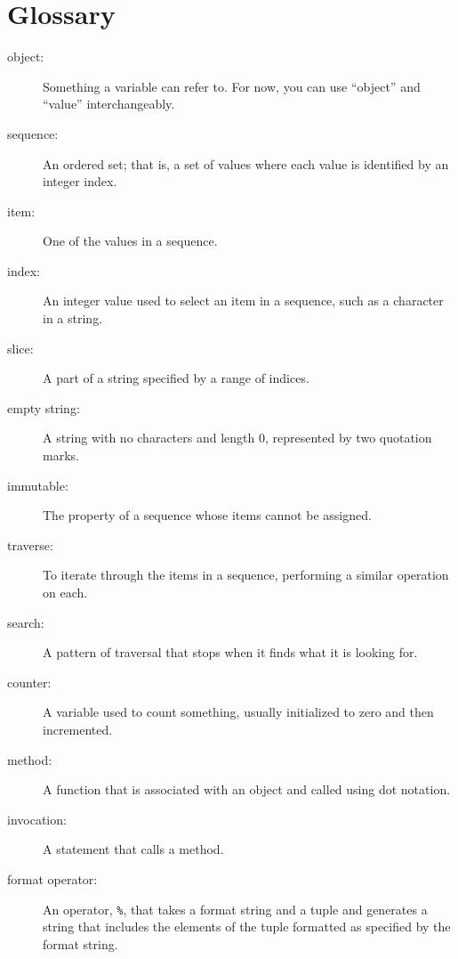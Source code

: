 \documentclass[10pt]{book}
\begin{document}
\section{Glossary}

\begin{description}

\item[object:] Something a variable can refer to.  For now,
you can use ``object'' and ``value'' interchangeably.

\item[sequence:] An ordered set; that is, a set of
values where each value is identified by an integer index.

\item[item:] One of the values in a sequence.

\item[index:] An integer value used to select an item in
a sequence, such as a character in a string.

\item[slice:] A part of a string specified by a range of indices.

\item[empty string:] A string with no characters and length 0, represented
by two quotation marks.

\item[immutable:] The property of a sequence whose items cannot
be assigned.

\item[traverse:] To iterate through the items in a sequence,
performing a similar operation on each.

\item[search:] A pattern of traversal that stops
when it finds what it is looking for.

\item[counter:] A variable used to count something, usually initialized
to zero and then incremented.

\item[method:] A function that is associated with an object and called
using dot notation.

\item[invocation:] A statement that calls a method.

\item[format operator:] An operator, {\tt \%}, that takes a format
string and a tuple and generates a string that includes
the elements of the tuple formatted as specified by the format string.


\end{description}
\end{document}
